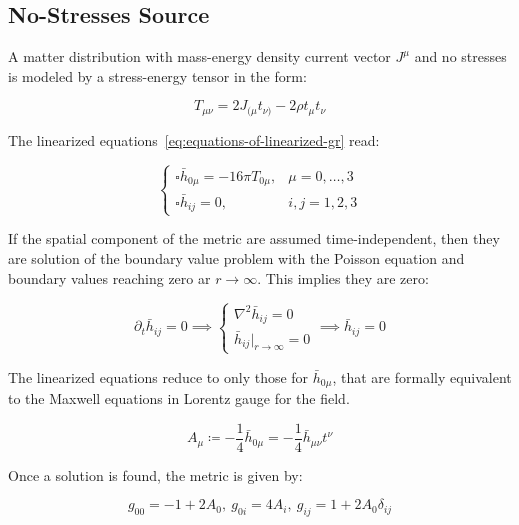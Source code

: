 \subsection{No-Stresses Source}\label{subsec:no-stresses-source}

A matter distribution with mass-energy density current vector $J^\mu$ and no stresses is modeled by a stress-energy tensor in the form:

\begin{equation}
    T_{\mu\nu} = 2J_{(\mu}t_{\nu)}-2\rho  t_{\mu} t_{\nu}\label{eq:no-stresses-stress-energy-tensor}
\end{equation}

The linearized equations~\ref{eq:equations-of-linearized-gr} read:

\begin{equation}
    \begin{cases}
        \square \bar h_{0\mu} = -16\pi T_{0\mu}, & \mu = 0,\dots,3\\
        \square \bar h_{ij} = 0, & i,j=1,2,3
    \end{cases}\label{eq:linearized-equations-no-stresses}
\end{equation}

If the spatial component of the metric are assumed time-independent, then they are solution of the boundary value problem with the Poisson equation and boundary values reaching zero ar $r\rightarrow\infty$.
This implies they are zero:

\begin{equation}
    \partial_t \bar h_{ij} = 0\implies
    \begin{cases}
        \nabla^2 \bar h_{ij} = 0 \\
        \bar h_{ij}|_{r\rightarrow\infty} =0
    \end{cases} \implies \bar h_{ij}=0\label{eq:linearized-answers-spatial}
\end{equation}

The linearized equations reduce to only those for $\bar h_{0\mu}$, that are formally equivalent to the Maxwell equations in Lorentz gauge for the field.

\begin{equation}
    A_{\mu} \coloneqq -\frac14 \bar h_{0\mu} = -\frac14 \bar h_{\mu\nu}t^{\nu}\label{eq:gauge-no-stresses-solution}
\end{equation}

Once a solution is found, the metric is given by:

\begin{equation}
    \label{eq:metric-no-stresses-source}
    g_{00} = -1 + 2A_0, \ g_{0i}=4 A_i, \ g_{ij} = 1+2A_0 \delta_{ij}
\end{equation}

